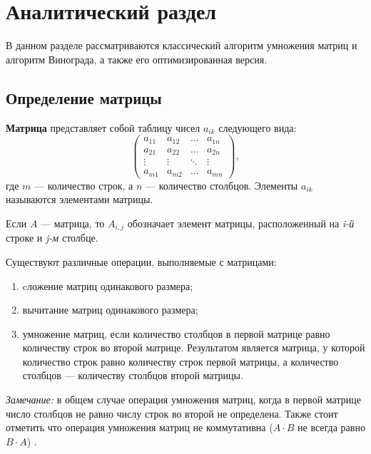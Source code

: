 \chapter{Аналитический раздел}


В данном разделе рассматриваются классический алгоритм умножения матриц и алгоритм Винограда, а также его оптимизированная версия.

\section{Определение матрицы}

\textbf{Матрица} \cite{book_matrix} представляет собой таблицу чисел $a_{ik}$ следующего вида:
\begin{equation}
	\begin{pmatrix}
		a_{11} & a_{12} & \ldots & a_{1n}\\
		a_{21} & a_{22} & \ldots & a_{2n}\\
		\vdots & \vdots & \ddots & \vdots\\
		a_{m1} & a_{m2} & \ldots & a_{mn}
	\end{pmatrix},
\end{equation}
где $m$ --- количество строк, а $n$ --- количество столбцов. Элементы $a_{ik}$ называются элементами матрицы.
	
Если $A$ --- матрица, то $A_{i,j}$ обозначает элемент матрицы, расположенный на \textit{i-й} строке и \textit{j-м} столбце.

Существуют различные операции, выполняемые с матрицами:
\begin{enumerate}
	\item cложение матриц одинакового размера;
	\item вычитание матриц одинакового размера;
	\item умножение матриц, 
	если количество столбцов в первой матрице равно количеству строк во второй матрице.
	Результатом является матрица, у которой количество строк равно количеству строк первой матрицы, 
	а количество столбцов --- количеству столбцов второй матрицы. 
\end{enumerate}
\textit{Замечание:} в общем случае операция умножения матриц, 
когда в первой матрице число столбцов не равно числу строк во второй не определена.
Также стоит отметить что операция умножения матриц не коммутативна ($A \cdot B$ не всегда равно $B \cdot A$) \cite{book_matrix}.

\clearpage

